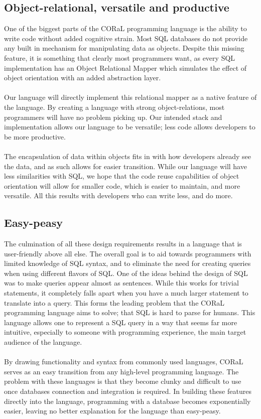 \documentclass[11pt]{report}
\begin{document}
\subsection*{Object-relational, versatile and productive}
One of the biggest parts of the CORaL programming language is the ability to write code without added cognitive strain. Most SQL databases do not provide any built in mechanism for manipulating data as objects. Despite this missing feature, it is something that clearly most programmers want, as every SQL implementation has an Object Relational Mapper which simulates the effect of object orientation with an added abstraction layer. 
\\
\\
Our language will directly implement this relational mapper as a native feature of the language. By creating a language with strong object-relations, most programmers will have no problem picking up. Our intended stack and implementation allows our language to be versatile; less code allows developers to be more productive. 
\\
\\
The encapsulation of data within objects fits in with how developers already see the data, and as such allows for easier transition. While our language will have less similarities with SQL, we hope that the code reuse capabilities of object orientation will allow for smaller code, which is easier to maintain, and more versatile. All this results with developers who can write less, and do more.

\subsection*{Easy-peasy}
The culmination of all these design requirements results in a language that is user-friendly above all else. The overall goal is to aid towards programmers with limited knowledge of SQL syntax, and to eliminate the need for creating queries when using different flavors of SQL. One of the ideas behind the design of SQL was to make queries appear almost as sentences. While this works for trivial statements, it completely falls apart when you have a much larger statement to translate into a query. This forms the leading problem that the CORaL programming language aims to solve; that SQL is hard to parse for humans. This language allows one to represent a SQL query in a way that seems far more intuitive, especially to someone with programming experience, the main target audience of the language. 
\\
\\
By drawing functionality and syntax from commonly used languages, CORaL serves as an easy transition from any high-level programming language. The problem with these languages is that they become clunky and difficult to use once databases connection and integration is required. In building these features directly into the language, programming with a database becomes exponentially easier, leaving no better explanation for the language than easy-peasy. 
\end{document}
